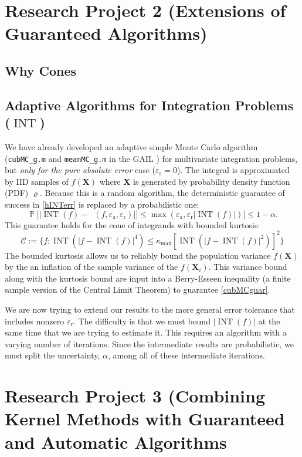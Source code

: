 \documentclass[11pt]{NSFamsart}
\DeclareMathOperator{\INT}{INT}
\DeclareMathOperator{\hINT}{\widehat{\INT}}
\newcommand{\bX}{{\boldsymbol{X}}}
\newcommand{\calc}{{\mathcal{C}}}
\DeclareMathOperator{\Prob}{\mathbb{P}}
\def\abs#1{\ensuremath{\left \lvert #1 \right \rvert}}
\newcommand{\bigabs}[1]{\ensuremath{\bigl \lvert #1 \bigr \rvert}}
\newcommand{\abstol}{\varepsilon_{\text{a}}}
\newcommand{\reltol}{\varepsilon_{\text{r}}}
\begin{document}
\section{Research Project 2 (Extensions of Guaranteed Algorithms)}\label{SectGAIL}
\subsection*{Why Cones}
\subsection*{Adaptive Algorithms for Integration Problems ($\INT$)}  We have already developed an adaptive simple Monte Carlo algorithm \citep{HicEtal14b} (\texttt{cubMC\_g.m} and \texttt{meanMC\_g.m} in the GAIL \citep{ChoEtal14a}) for multivariate integration problems, but \emph{only for the pure absolute error} case ($\reltol=0$).  The integral is approximated by IID samples of $f(\bX)$ where $\bX$ is generated by probability density function (PDF) $\varrho$. Because this is a random algorithm, the deterministic guarantee of success in \eqref{hINTerr} is replaced by a probabilistic one:
\begin{equation} \label{cubMCguar}
 \Prob\bigl[\bigabs{\INT(f) -\hINT(f,\abstol,\reltol)} \bigr ] \le \max(\abstol,\reltol \abs{\INT(f)}) \bigr] \le 1-\alpha.
\end{equation}
This guarantee holds for the cone of integrands with bounded kurtosis:
\begin{equation}
\calc := \bigl \{ f : \INT(\abs{f - \INT(f)}^4) \le \kappa_{\max} [\INT(\abs{f - \INT(f)}^2)]^2 \bigr\}
\end{equation}
The bounded kurtosis allows us to reliably bound the population variance $f(\bX)$ by the an inflation of the sample variance of the $f(\bX_i)$. This variance bound along with the kurtosis bound are input into a Berry-Esseen inequality (a finite sample version of the Central Limit Theorem) to guarantee \eqref{cubMCguar}.

We are now trying to extend our results to the more general error tolerance that includes nonzero $\reltol$.  The difficulty is that we must bound $\abs{\INT(f)}$ at the same time that we are trying to estimate it.  This requires an algorithm with a varying number of iterations.  Since the intermediate results are probabilistic, we must split the uncertainty, $\alpha$, among all of these intermediate iterations.



\section{Research Project 3 (Combining Kernel Methods with Guaranteed and Automatic Algorithms}
\end{document}
